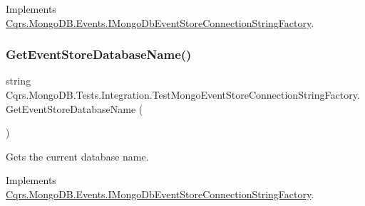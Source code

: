 Implements \hyperlink{interfaceCqrs_1_1MongoDB_1_1Events_1_1IMongoDbEventStoreConnectionStringFactory_a3860ea4bf6793b081f03fb7cc1dcbb27_a3860ea4bf6793b081f03fb7cc1dcbb27}{Cqrs.\+Mongo\+D\+B.\+Events.\+I\+Mongo\+Db\+Event\+Store\+Connection\+String\+Factory}.

\mbox{\label{classCqrs_1_1MongoDB_1_1Tests_1_1Integration_1_1TestMongoEventStoreConnectionStringFactory_adbefedfb3bea3521f72333ce47575301_adbefedfb3bea3521f72333ce47575301}} 
\subsubsection{\texorpdfstring{Get\+Event\+Store\+Database\+Name()}{GetEventStoreDatabaseName()}}
{\footnotesize\ttfamily string Cqrs.\+Mongo\+D\+B.\+Tests.\+Integration.\+Test\+Mongo\+Event\+Store\+Connection\+String\+Factory.\+Get\+Event\+Store\+Database\+Name (\begin{DoxyParamCaption}{ }\end{DoxyParamCaption})}



Gets the current database name. 



Implements \hyperlink{interfaceCqrs_1_1MongoDB_1_1Events_1_1IMongoDbEventStoreConnectionStringFactory_a81ee28bfbb0e567b95f2b280bc6fb298_a81ee28bfbb0e567b95f2b280bc6fb298}{Cqrs.\+Mongo\+D\+B.\+Events.\+I\+Mongo\+Db\+Event\+Store\+Connection\+String\+Factory}.



